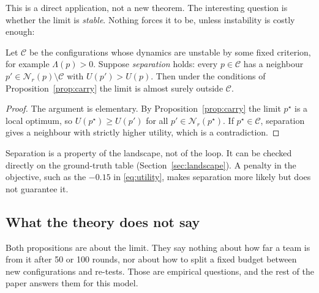 This is a direct application, not a new theorem. The interesting question is whether the limit is \emph{stable}. Nothing forces it to be, unless instability is costly enough:

\begin{proposition}\label{prop:sep}
Let $\mathcal C$ be the configurations whose dynamics are unstable by some fixed criterion, for example $\Lambda(p)>0$. Suppose \emph{separation} holds: every $p\in\mathcal C$ has a neighbour $p'\in\mathcal N_r(p)\setminus\mathcal C$ with $U(p')>U(p)$. Then under the conditions of Proposition~\ref{prop:carry} the limit is almost surely outside $\mathcal C$.
\end{proposition}
\begin{proof}
The argument is elementary. By Proposition~\ref{prop:carry} the limit $p^\star$ is a local optimum, so $U(p^\star)\ge U(p')$ for all $p'\in\mathcal N_r(p^\star)$. If $p^\star\in\mathcal C$, separation gives a neighbour with strictly higher utility, which is a contradiction.
\end{proof}

Separation is a property of the landscape, not of the loop. It can be checked directly on the ground-truth table (Section~\ref{sec:landscape}). A penalty in the objective, such as the $-0.15$ in \eqref{eq:utility}, makes separation more likely but does not guarantee it.

\subsection{What the theory does not say}
Both propositions are about the limit. They say nothing about how far a team is from it after 50 or 100 rounds, nor about how to split a fixed budget between new configurations and re-tests. Those are empirical questions, and the rest of the paper answers them for this model.
